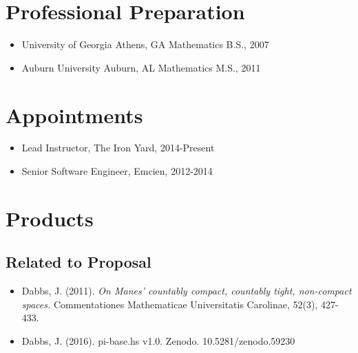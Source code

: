 \section{Professional Preparation}

\begin{itemize}
  \item University of Georgia \hspace{3em}
        Athens, GA \hspace{3em}
        Mathematics \hspace{3em}
        B.S., 2007
  \item Auburn University \hspace{3em}
        Auburn, AL \hspace{3em}
        Mathematics \hspace{3em}
        M.S., 2011
\end{itemize}



\section{Appointments}

\begin{itemize}
    \item Lead Instructor, The Iron Yard, 2014-Present
    \item Senior Software Engineer, Emcien, 2012-2014
\end{itemize}


\section{Products}

\subsection{Related to Proposal}

\begin{itemize}
  \item Dabbs, J. (2011).
        \textit{On Manes' countably compact, countably tight, non-compact spaces.}
        Commentationes Mathematicae Universitatis Carolinae, 52(3), 427-433.
  \item Dabbs, J. (2016). pi-base.hs v1.0. Zenodo. 10.5281/zenodo.59230
\end{itemize}

